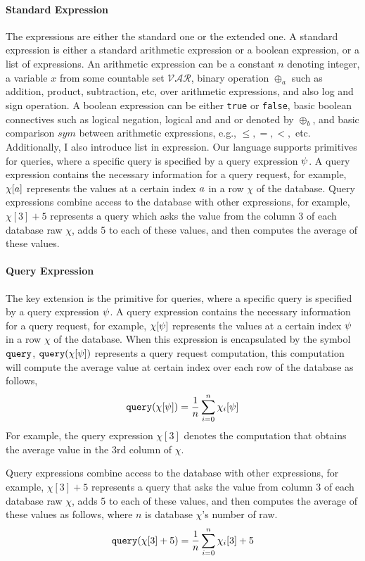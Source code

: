 \paragraph{Standard Expression}
The expressions are either the standard one or the extended one.
A standard expression is
either a standard arithmetic expression or a boolean expression, or a list of expressions.
An arithmetic expression can be a constant $n$ denoting integer, a variable $x$ from some countable set $\mathcal{VAR}$, binary operation $\oplus_a$ such as addition, product, subtraction, etc, over arithmetic expressions, and also log and sign operation. 
%
A boolean expression can be either {\tt true} or {\tt false}, basic boolean connectives such as logical negation, logical and and or denoted by $\oplus_b$, and basic comparison $sym$ between arithmetic expressions, e.g., $\leq,=,<,$ etc.
Additionally, I also introduce list in expression.
Our language supports primitives for queries, 
where a specific query is specified by a query expression $\psi$. 
A query expression contains the necessary information for a query request, for example, 
$\chi[a]$ represents the values at a certain index $a$ in a row $\chi$ of the database. 
Query expressions combine access to the database with other expressions, 
for example, $\chi[3] + 5$ represents a query which asks the value from the column 3 of each database raw $\chi$, adds 5 to each of these values, 
and then computes the average of these values.
\paragraph{Query Expression}
The key extension is
the primitive for queries, where a specific query is specified by a query expression $\psi$. 
A query expression contains the necessary information for a query request, 
for example, $\chi[\psi]$ represents the values at a certain index $\psi$ in a row $\chi$ of the database. 
When this expression is encapsulated by the symbol ${\tt query}$,
 $ {\tt query}(\chi[\psi]) $ represents a query request computation, this computation will compute the average value at certain index over each row of the database as follows,
 \[
  {\tt query}(\chi[\psi]) = \frac{1}{n}\sum\limits_{i = 0}^{n}\chi_i[\psi]
  \]
For example, the query expression $\chi[3]$  denotes the computation that
obtains
the average value in the $3$rd column of $\chi$.

Query expressions combine access to the database with other expressions, 
for example, 
$\chi[3] + 5$ represents a query that asks the value from column 3 of each database raw $\chi$, 
adds 5 to each of these values, and then computes the average of these values as follows, where $n$ is 
database $\chi$'s number of raw.
%
\[
  {\tt query}(\chi[3] + 5) = \frac{1}{n}\sum\limits_{i = 0}^{n}\chi_i[3] + 5
  \]


